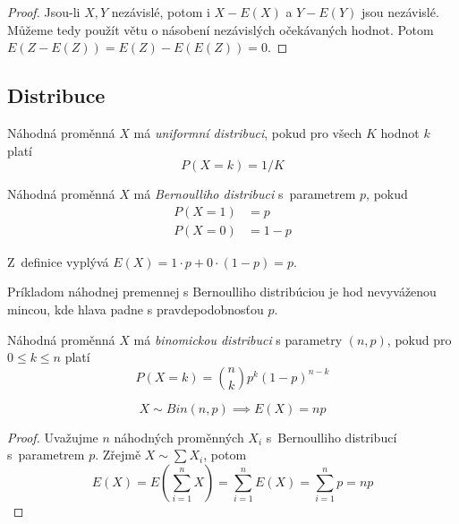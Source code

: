 \begin{proof}
    Jsou-li $X, Y$ nezávislé, potom i $X - E(X)$ a $Y - E(Y)$ jsou
    nezávislé. Můžeme tedy použít větu o násobení nezávislých
    očekávaných hodnot. Potom $E(Z - E(Z)) = E(Z) - E(E(Z)) = 0$.
\end{proof}

\subsection{Distribuce}

\begin{definition}
    Náhodná proměnná $X$ má {\em uniformní distribuci},
    pokud pro všech $K$ hodnot $k$ platí
    \[
        P(X = k) = 1/K
    \]
\end{definition}

\begin{definition}
    Náhodná proměnná $X$ má {\em Bernoulliho distribuci} s~parametrem
    $p$, pokud
    \begin{align*}
        P(X = 1) &= p  \\
        P(X = 0) &= 1 - p
    \end{align*}
\end{definition}

Z~definice vyplývá $E(X) = 1 \cdot p + 0 \cdot (1-p) = p$.

\begin{example}
    Príkladom náhodnej premennej s Bernoulliho distribúciou
	je hod nevyváženou mincou, kde hlava padne s pravdepodobnosťou $p$.
\end{example}

\begin{definition}
    Náhodná proměnná $X$ má {\em binomickou distribuci} s parametry $(n, p)$,
    pokud pro $0 \leq k \leq n$ platí
\[
    P(X = k) = {{n} \choose {k}} p^k (1 - p)^{n - k}
\]
\end{definition}

\begin{theorem}
    \[
        X \sim Bin(n,p) \implies E(X) = np
    \]
\end{theorem}

\begin{proof}
    Uvažujme $n$ náhodných proměnných $X_i$ s~Bernoulliho distribucí
    s~parametrem $p$.
    Zřejmě $X \sim \sum X_i$, potom
    \[
        E(X) = E( \sum_{i = 1}^{n} X )
             = \sum_{i = 1}^{n} E(X)
             = \sum_{i = 1}^{n} p
             = n p
    \]
\end{proof}

